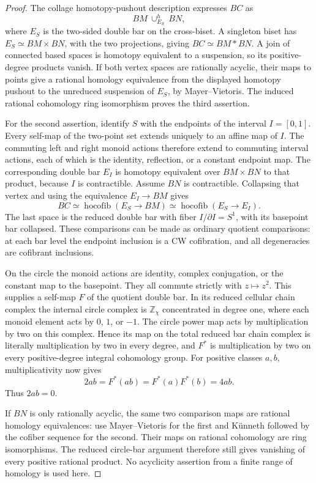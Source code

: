 \begin{proof}
The collage homotopy-pushout description expresses $BC$ as
\[
 BM\ \cup^h_{E_S}\ BN,
\]
where $E_S$ is the two-sided double bar on the cross-biset. A singleton
biset has $E_S\simeq BM\times BN$, with the two projections, giving
$BC\simeq BM*BN$. A join of connected based spaces is homotopy
equivalent to a suspension, so its positive-degree products vanish.
If both vertex spaces are rationally acyclic, their maps to points give
a rational homology equivalence from the displayed homotopy pushout
to the unreduced suspension of $E_S$, by Mayer--Vietoris. The induced
rational cohomology ring isomorphism proves the third assertion.

For the second assertion, identify $S$ with the endpoints of the
interval $I=[0,1]$. Every self-map of the two-point set extends uniquely
to an affine map of $I$. The commuting left and right monoid actions
therefore extend to commuting interval actions, each of which is the
identity, reflection, or a constant endpoint map. The corresponding
double bar $E_I$ is homotopy equivalent over $BM\times BN$ to that
product, because $I$ is contractible. Assume $BN$ is contractible.
Collapsing that vertex and using the equivalence $E_I\to BM$ gives
\[
 BC\simeq\operatorname{hocofib}(E_S\to BM)
       \simeq\operatorname{hocofib}(E_S\to E_I).
\]
The last space is the reduced double bar with fiber
$I/\partial I=S^1$, with its basepoint bar collapsed. These comparisons
can be made as ordinary quotient comparisons: at each bar level the
endpoint inclusion is a CW cofibration, and all degeneracies are
cofibrant inclusions.

On the circle the monoid actions are identity, complex conjugation,
or the constant map to the basepoint. They all commute strictly with
$z\mapsto z^2$. This supplies a self-map $F$ of the quotient double
bar. In its reduced cellular chain complex the internal circle complex
is $\mathbb Z_\chi$ concentrated in degree one, where each monoid
element acts by $0$, $1$, or $-1$. The circle power map acts by
multiplication by two on this complex. Hence its map on the total
reduced bar chain complex is literally multiplication by two in every
degree, and $F^*$ is multiplication by two on every positive-degree
integral cohomology group. For positive classes $a,b$, multiplicativity
now gives
\[
 2ab=F^*(ab)=F^*(a)F^*(b)=4ab.
\]
Thus $2ab=0$.

If $BN$ is only rationally acyclic, the same two comparison maps are
rational homology equivalences: use Mayer--Vietoris for the first and
K\"unneth followed by the cofiber sequence for the second. Their maps
on rational cohomology are ring isomorphisms. The reduced circle-bar
argument therefore still gives vanishing of every positive rational
product. No acyclicity assertion from a finite range of homology is
used here.


\end{proof}
